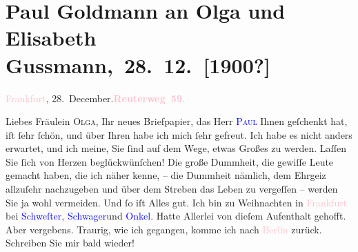 

\renewcommand{\erwaehntePersonen}{Personen: Peter Altenberg, Paul Goldmann, Clementine Goldmann, Fedor Mamroth, Paul Marx, Guy de Maupassant, Vally Rosengart, Josef Rosengart, Olga Schnitzler, Elisabeth Steinrück}
\renewcommand{\erwaehnteOrte}{Orte: Berlin, Frankfurt am Main, Reuterweg, Wien}
\renewcommand{\erwaehnteWerke}{Werke: Rosenmontag}
\section[ Paul Goldmann an Olga und Elisabeth Gussmann, 28. 12. {[}1900?{]}]{Paul Goldmann an Olga und Elisabeth Gussmann, 28. 12. {[}1900?{]}}
\nopagebreak{}
\rehead{ }\normalsize\beginnumbering{}
\toendnotes[C]{\smallbreak\pagebreak[2]}
\toendnotes[C]{\smallbreak}
\pstart
           \noindent{}\textcolor{pink}{Frankfurt}{}\ledrightnote{\textcolor{pink}{Frankfurt am Main}}, 28. December.\hfill {\pb}\textcolor{gray}{\textbf{\textcolor{pink}{Reuterweg 59.}{}\ledrightnote{\textcolor{pink}{Reuterweg}}}}\pend
           
\pstart\center{}Liebes Fräulein \textsc{Olga},\pend
\pstart
           Ihr neues Briefpapier, das Herr \textsc{\textcolor{blue}{Paul}{}\ledrightnote{\textcolor{blue}{Paul Marx}}} Ihnen geſchenkt hat, iſt ſehr ſchön, und über Ihren \label{K_L03538-1v}\label{K_L03538-1h} habe ich mich ſehr gefreut. Ich habe es nicht anders erwartet, und ich meine,
               Sie ſind auf dem Wege, etwas Großes zu werden. Laſſen Sie ſich von Herzen
               beglückwünſchen! Die große Dummheit, die gewiſſe Leute gemacht haben, die ich näher
               kenne, – die Dummheit nämlich, dem Ehrgeiz allzuſehr nachzugeben und über dem Streben
               das Leben zu vergeſſen – werden Sie ja wohl vermeiden. Und ſo iſt Alles gut. Ich bin
               zu Weihnachten in \textcolor{pink}{Frankfurt}{}\ledrightnote{\textcolor{pink}{Frankfurt am Main}} bei \textcolor{blue}{Schweſter}{}\ledrightnote{{$\rightarrow$}\textcolor{blue}{Vally Rosengart}}, \textcolor{blue}{Schwager}{}\ledrightnote{{$\rightarrow$}\textcolor{blue}{Josef Rosengart}}{ }{\pb}und \textcolor{blue}{Onkel}{}\ledrightnote{{$\rightarrow$}\textcolor{blue}{Fedor Mamroth}}. Hatte Allerlei von dieſem Aufenthalt gehofft. Aber
               vergebens. Traurig, wie ich gegangen, komme ich nach \textcolor{pink}{Berlin}{}\ledrightnote{\textcolor{pink}{Berlin}} zurück. Schreiben Sie mir bald wieder!\pend
           
